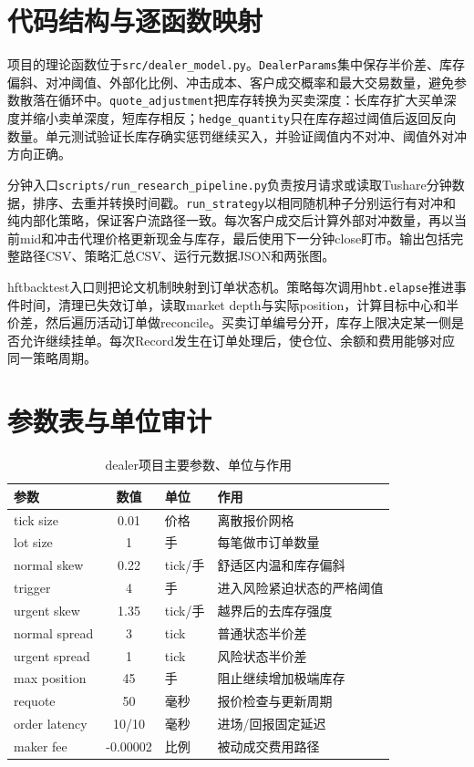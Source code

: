 \documentclass[11pt]{ctexart}
\begin{document}
\section{代码结构与逐函数映射}
项目的理论函数位于\texttt{src/dealer\_model.py}。\texttt{DealerParams}集中保存半价差、库存偏斜、对冲阈值、外部化比例、冲击成本、客户成交概率和最大交易数量，避免参数散落在循环中。\texttt{quote\_adjustment}把库存转换为买卖深度：长库存扩大买单深度并缩小卖单深度，短库存相反；\texttt{hedge\_quantity}只在库存超过阈值后返回反向数量。单元测试验证长库存确实惩罚继续买入，并验证阈值内不对冲、阈值外对冲方向正确。

分钟入口\texttt{scripts/run\_research\_pipeline.py}负责按月请求或读取Tushare分钟数据，排序、去重并转换时间戳。\texttt{run\_strategy}以相同随机种子分别运行有对冲和纯内部化策略，保证客户流路径一致。每次客户成交后计算外部对冲数量，再以当前mid和冲击代理价格更新现金与库存，最后使用下一分钟close盯市。输出包括完整路径CSV、策略汇总CSV、运行元数据JSON和两张图。

hftbacktest入口则把论文机制映射到订单状态机。策略每次调用\texttt{hbt.elapse}推进事件时间，清理已失效订单，读取market depth与实际position，计算目标中心和半价差，然后遍历活动订单做reconcile。买卖订单编号分开，库存上限决定某一侧是否允许继续挂单。每次Record发生在订单处理后，使仓位、余额和费用能够对应同一策略周期。

\section{参数表与单位审计}
\begin{table}[H]\centering\caption{dealer项目主要参数、单位与作用}\begin{tabularx}{\textwidth}{lclX}\toprule
参数&数值&单位&作用\\\midrule
tick size&0.01&价格&离散报价网格\\
lot size&1&手&每笔做市订单数量\\
normal skew&0.22&tick/手&舒适区内温和库存偏斜\\
trigger&4&手&进入风险紧迫状态的严格阈值\\
urgent skew&1.35&tick/手&越界后的去库存强度\\
normal spread&3&tick&普通状态半价差\\
urgent spread&1&tick&风险状态半价差\\
max position&45&手&阻止继续增加极端库存\\
requote&50&毫秒&报价检查与更新周期\\
order latency&10/10&毫秒&进场/回报固定延迟\\
maker fee&-0.00002&比例&被动成交费用路径\\
\bottomrule\end{tabularx}\end{table}
\end{document}
